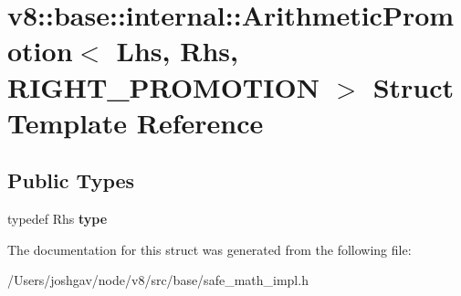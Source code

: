 \hypertarget{structv8_1_1base_1_1internal_1_1_arithmetic_promotion_3_01_lhs_00_01_rhs_00_01_r_i_g_h_t___p_r_o_m_o_t_i_o_n_01_4}{}\section{v8\+:\+:base\+:\+:internal\+:\+:Arithmetic\+Promotion$<$ Lhs, Rhs, R\+I\+G\+H\+T\+\_\+\+P\+R\+O\+M\+O\+T\+I\+ON $>$ Struct Template Reference}
\label{structv8_1_1base_1_1internal_1_1_arithmetic_promotion_3_01_lhs_00_01_rhs_00_01_r_i_g_h_t___p_r_o_m_o_t_i_o_n_01_4}
\subsection*{Public Types}
\begin{DoxyCompactItemize}
\item 
typedef Rhs {\bfseries type}\hypertarget{structv8_1_1base_1_1internal_1_1_arithmetic_promotion_3_01_lhs_00_01_rhs_00_01_r_i_g_h_t___p_r_o_m_o_t_i_o_n_01_4_a95c5df9835e2fe65234e08aff0c957b2}{}\label{structv8_1_1base_1_1internal_1_1_arithmetic_promotion_3_01_lhs_00_01_rhs_00_01_r_i_g_h_t___p_r_o_m_o_t_i_o_n_01_4_a95c5df9835e2fe65234e08aff0c957b2}

\end{DoxyCompactItemize}


The documentation for this struct was generated from the following file\+:\begin{DoxyCompactItemize}
\item 
/\+Users/joshgav/node/v8/src/base/safe\+\_\+math\+\_\+impl.\+h\end{DoxyCompactItemize}
